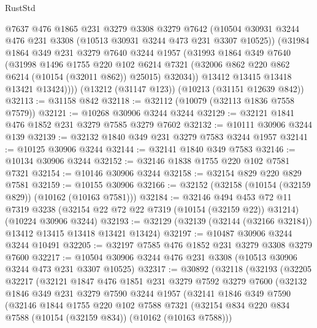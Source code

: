 \begin{lexlean}{RustStd}
\begin{coremodule}
{\begin{coremodule}
{{{{{{{{{{{{{{{{{{{{{{{{{{          @7637
          @476
          @1865
          @231
          @3279
          @3308
          @3279
          @7642
          (@10504 @30931 @3244 @476 @231 @3308 (@10513 @30931 @3244 @473 @231 @3307 @10525))
          (@31984
            @1864
            @349
            @231
            @3279
            @7640
            @3244
            @1957
            (@31993
              @1864
              @349
              @7640
              (@31998
                @1496
                @1755
                @220
                @102
                @6214
                @7321
                (@32006 @862 @220 @862 @6214 (@10154 (@32011 @862)) @25015)
                @32034))
            @13412
            @13415
            @13418
            @13421
            @13424))))
    (@13212 (@31147 @123))
    (@10213 (@31151 @12639 @842))
@32113 := @31158 @842
@32118 := @32112 (@10079 (@32113 @1836 @7558 @7579))
@32121 := @10268 @30906 @3244 @3244
@32129 := @32121 @1841 @476 @1852 @231 @3279 @7585 @3279 @7602
@32132 := @10111 @30906 @3244 @139
@32139 := @32132 @1840 @349 @231 @3279 @7583 @3244 @1957
@32141 := @10125 @30906 @3244
@32144 := @32141 @1840 @349 @7583
@32146 := @10134 @30906 @3244
@32152 := @32146 @1838 @1755 @220 @102 @7581 @7321
@32154 := @10146 @30906 @3244
@32158 := @32154 @829 @220 @829 @7581
@32159 := @10155 @30906
@32166 := @32152 (@32158 (@10154 (@32159 @829)) (@10162 (@10163 @7581)))
@32184 := @32146
    @494
    @453
    @72
    @11
    @7319
    @3238
    (@32154 @22 @72 @22 @7319 (@10154 (@32159 @22)) @31214)
    (@10224 @30906 @3244)
@32193 := @32129 (@32139 (@32144 (@32166 @32184)) @13412 @13415 @13418 @13421 @13424)
@32197 := @10487 @30906 @3244 @3244 @10491
@32205 := @32197 @7585 @476 @1852 @231 @3279 @3308 @3279 @7600
@32217 := @10504 @30906 @3244 @476 @231 @3308 (@10513 @30906 @3244 @473 @231 @3307 @10525)
@32317 := @30892
    (@32118
      (@32193
        (@32205
          @32217
          (@32121
            @1847
            @476
            @1851
            @231
            @3279
            @7592
            @3279
            @7600
            (@32132
              @1846
              @349
              @231
              @3279
              @7590
              @3244
              @1957
              (@32141
                @1846
                @349
                @7590
                (@32146
                  @1844
                  @1755
                  @220
                  @102
                  @7588
                  @7321
                  (@32154 @834 @220 @834 @7588 (@10154 (@32159 @834)) (@10162 (@10163 @7588)))
}}}}}}}}}}}}}}}}}}}}}}}}}}
\end{coremodule}}
\end{coremodule}
\end{lexlean}
